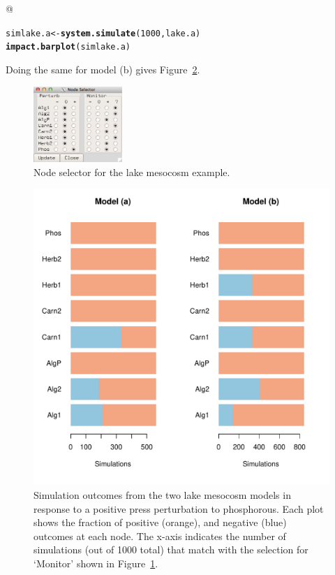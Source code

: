 \documentclass[a4paper]{article}\usepackage[]{graphicx}\usepackage[]{color}
\makeatletter
\def\maxwidth{ %
  \ifdim\Gin@nat@width>\linewidth
    \linewidth
  \else
    \Gin@nat@width
  \fi
}
\newcommand{\hlnum}[1]{\textcolor[rgb]{0.686,0.059,0.569}{#1}}%
\newcommand{\hlstd}[1]{\textcolor[rgb]{0.345,0.345,0.345}{#1}}%
\newcommand{\hlkwb}[1]{\textcolor[rgb]{0.69,0.353,0.396}{#1}}%
\newcommand{\hlkwd}[1]{\textcolor[rgb]{0.737,0.353,0.396}{\textbf{#1}}}%
\newenvironment{kframe}{%
 \def\at@end@of@kframe{}%
 \ifinner\ifhmode%
  \def\at@end@of@kframe{\end{minipage}}%
  \begin{minipage}{\columnwidth}%
 \fi\fi%
 \def\FrameCommand##1{\hskip\@totalleftmargin \hskip-\fboxsep
 \colorbox{shadecolor}{##1}\hskip-\fboxsep
     \hskip-\linewidth \hskip-\@totalleftmargin \hskip\columnwidth}%
 \MakeFramed {\advance\hsize-\width
   \@totalleftmargin\z@ \linewidth\hsize
   \@setminipage}}%
 {\par\unskip\endMakeFramed%
 \at@end@of@kframe}
\newenvironment{knitrout}{}{} %
\makeatother
\begin{document}
@
\begin{knitrout}
\color{fgcolor}\begin{kframe}
\begin{alltt}
\hlstd{simlake.a} \hlkwb{<-} \hlkwd{system.simulate}\hlstd{(}\hlnum{1000}\hlstd{,lake.a)}
\hlkwd{impact.barplot}\hlstd{(simlake.a)}
\end{alltt}
\end{kframe}
\end{knitrout}
Doing the same for model (b) gives Figure~\ref{fig:Perturb1}.

\begin{figure}[ht]
  \centering
  \includegraphics[width=0.3\textwidth]{Lake-selector.png}
  \caption{Node selector for the lake mesocosm example.}
  \label{fig:Selector1}
\end{figure}

\begin{figure}[ht]
  \centering
\begin{knitrout}
\color{fgcolor}
\includegraphics[width=\maxwidth]{figure/unnamed-chunk-3-1} 

\end{knitrout}
\caption{Simulation outcomes from the two lake mesocosm models in response to a
  positive press perturbation to phosphorous. Each plot shows the fraction of
  positive (orange), and negative (blue) outcomes at each node. The x-axis
  indicates the number of simulations (out of 1000 total) that match with the
  selection for `Monitor' shown in Figure~\ref{fig:Selector1}.}
  \label{fig:Perturb1}
\end{figure}
\end{document}
